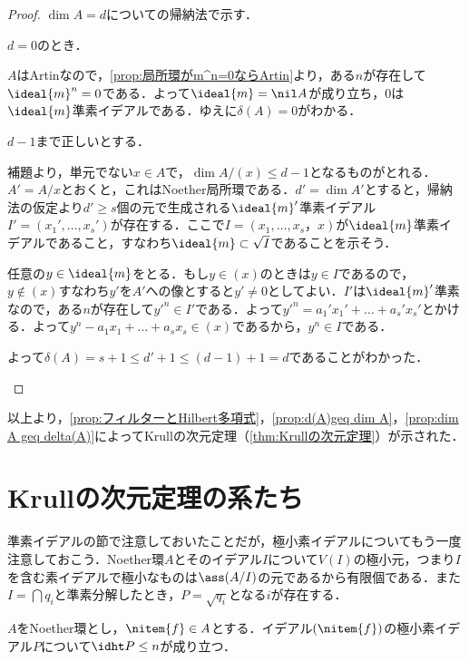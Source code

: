\begin{proof}
	$\dim A=d$についての帰納法で示す．
	
	\begin{step}
		\item $d=0$のとき．
		
		$A$はArtinなので，\ref{prop:局所環がm^n=0ならArtin}より，ある$n$が存在して$\ideal{m}^n=0$である．よって$\ideal{m}=\nil A$が成り立ち，$0$は$\ideal{m}$準素イデアルである．ゆえに$\delta(A)=0$がわかる．
		
		\item $d-1$まで正しいとする．
		
		補題より，単元でない$x\in A$で，$\dim A/(x)\leq d-1$となるものがとれる．$A'=A/x$とおくと，これはNoether局所環である．$d'=\dim A'$とすると，帰納法の仮定より$d'\geq s$個の元で生成される$\ideal{m}'$準素イデアル$I'=(x_1',\dots,x_s')$が存在する．ここで$I=(x_1,\dots,x_s，x)$が$\ideal{m}$準素イデアルであること，すなわち$\ideal{m}\subset\sqrt{I}$であることを示そう．
		
		任意の$y\in\ideal{m}$をとる．もし$y\in (x)$のときは$y\in I$であるので，$y\not\in(x)$すなわち$y'$を$A'$への像とすると$y'\neq0$としてよい．$I'$は$\ideal{m}'$準素なので，ある$n$が存在して$y'^n\in I'$である．よって$y'^n=a_1'x_1'+\dots+a_s'x_s'$とかける．よって$y^n-a_1x_1+\dots+a_sx_s\in (x)$であるから，$y^n\in I$である．
		
		よって$\delta(A)=s+1\leq d'+1\leq (d-1)+1=d$であることがわかった．
	\end{step}
\end{proof}

以上より，\ref{prop:フィルターとHilbert多項式}，\ref{prop:d(A)geq dim A}，\ref{prop:dim A geq delta(A)}によってKrullの次元定理（\ref{thm:Krullの次元定理}）が示された．

\section{Krullの次元定理の系たち}

準素イデアルの節で注意しておいたことだが，極小素イデアルについてもう一度注意しておこう．Noether環$A$とそのイデアル$I$について$V(I)$の極小元，つまり$I$を含む素イデアルで極小なものは$\ass(A/I)$の元であるから有限個である．また$I=\bigcap q_i$と準素分解したとき，$P=\sqrt{q_i}$となる$i$が存在する．
\begin{thm}[Krullの標高定理]
	$A$をNoether環とし，$\nitem{f}\in A$とする．イデアル$(\nitem{f})$の極小素イデアル$P$について$\idht P\leq n$が成り立つ．
\end{thm}

